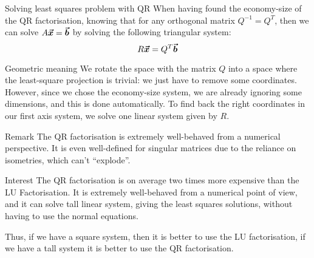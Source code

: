 \documentclass[a4paper]{article}
\begin{document}
\begin{parag}{Solving least squares problem with QR}
    When having found the economy-size of the QR factorisation, knowing that for any orthogonal matrix $Q^{-1} = Q^T$, then we can solve $A \bm{\protect\vec{x}} = \bm{\protect\vec{b}}$ by solving the following triangular system: 
    \[R \bm{\protect\vec{x}} = Q^T \bm{\protect\vec{b}}\]
    
    \begin{subparag}{Geometric meaning}
        We rotate the space with the matrix $Q$ into a space where the least-square projection is trivial: we just have to remove some coordinates. However, since we chose the economy-size system, we are already ignoring some dimensions, and this is done automatically. To find back the right coordinates in our first axis system, we solve one linear system given by $R$.

    \end{subparag}

    \begin{subparag}{Remark}
        The QR factorisation is extremely well-behaved from a numerical perspective. It is even well-defined for singular matrices due to the reliance on isometries, which can't ``explode''.
    \end{subparag}
    
\end{parag}

\begin{parag}{Interest}
    The QR factorisation is on average two times more expensive than the LU Factorisation. It is extremely well-behaved from a numerical point of view, and it can solve tall linear system, giving the least squares solutions, without having to use the normal equations.

    Thus, if we have a square system, then it is better to use the LU factorisation, if we have a tall system it is better to use the QR factorisation.
\end{parag}
\end{document}
